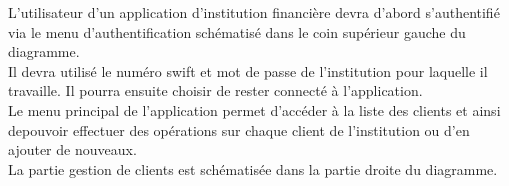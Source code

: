 \documentclass{article}
\begin{document}
L'utilisateur d'un application d'institution financière devra d'abord s'authentifié via le menu d'authentification schématisé dans le coin supérieur gauche du diagramme.\\
Il devra utilisé le numéro swift et mot de passe de l'institution pour laquelle il travaille. Il pourra ensuite choisir de rester connecté à l'application.\\
Le menu principal de l'application permet d'accéder à la liste des clients et ainsi depouvoir effectuer des opérations sur chaque client de l'institution ou d'en ajouter de nouveaux.\\
La partie gestion de clients est schématisée dans la partie droite du diagramme.
\end{document}
